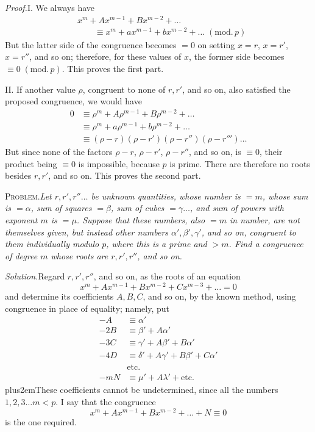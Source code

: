 \emph{Proof.}\quad I. We always have
\[
\begin{aligned}
&x^m+Ax^{m-1}+Bx^{m-2}+\ldots\\
&\qquad\equiv x^m+ax^{m-1}+bx^{m-2}+\ldots\;(\mathrm{mod.}\,p)
\end{aligned}
\]
But the latter side of the congruence becomes $=0$ on setting $x=r$, $x=r'$, $x=r''$, and so on; therefore, for these values of $x$, the former side becomes $\equiv0\;(\mathrm{mod.}\,p)$. This proves the first part.

II. If another value $\rho$, congruent to none of $r,r'$, and so on, also satisfied the proposed congruence, we would have
\[
\begin{aligned}
0&\equiv\rho^m+A\rho^{m-1}+B\rho^{m-2}+\ldots\\
&\equiv\rho^m+a\rho^{m-1}+b\rho^{m-2}+\ldots\\
&\equiv(\rho-r)(\rho-r')(\rho-r'')(\rho-r''')\ldots
\end{aligned}
\]
But since none of the factors $\rho-r$, $\rho-r'$, $\rho-r''$, and so on, is $\equiv0$, their product being $\equiv0$ is impossible, because $p$ is prime. There are therefore no roots besides $r,r'$, and so on. This proves the second part.

\textsc{Problem.}\quad\emph{Let $r,r',r''\ldots$ be unknown quantities, whose number is $=m$, whose sum is $=\alpha$, sum of squares $=\beta$, sum of cubes $=\gamma\ldots$, and sum of powers with exponent $m$ is $=\mu$. Suppose that these numbers, also $=m$ in number, are not themselves given, but instead other numbers $\alpha',\beta',\gamma'$, and so on, congruent to them individually modulo $p$, where this is a prime and $>m$. Find a congruence of degree $m$ whose roots are $r,r',r''$, and so on.}

\emph{Solution.}\quad Regard $r,r',r''$, and so on, as the roots of an equation
\[
x^m+Ax^{m-1}+Bx^{m-2}+Cx^{m-3}+\ldots=0
\]
and determine its coefficients $A,B,C$, and so on, by the known method, using congruence in place of equality; namely, put
\[
\begin{aligned}
-A&\equiv\alpha'\\
-2B&\equiv\beta'+A\alpha'\\
-3C&\equiv\gamma'+A\beta'+B\alpha'\\
-4D&\equiv\delta'+A\gamma'+B\beta'+C\alpha'\\
&\text{etc.}\\
-mN&\equiv\mu'+A\lambda'+\text{etc.}
\end{aligned}
\]
\begingroup\rightskip=0pt plus2em\relax These coefficients cannot be undetermined, since all the numbers \mbox{$1,2,3\ldots m<p$}. I say that the congruence
\[
x^m+Ax^{m-1}+Bx^{m-2}+\ldots+N\equiv0
\]
is the one required.\par\endgroup

